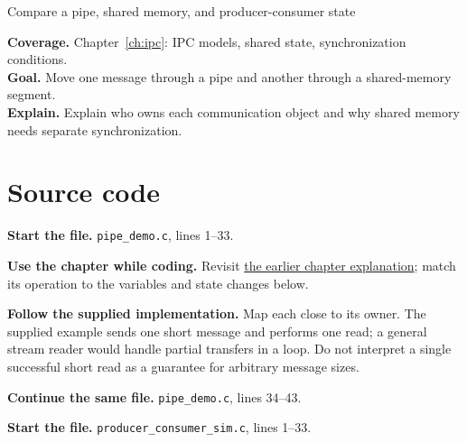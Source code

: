 \begin{labproject}{Compare a pipe, shared memory, and producer-consumer state}

\textbf{Coverage.} Chapter~\ref{ch:ipc}: IPC models, shared state, synchronization conditions.\\
\textbf{Goal.} Move one message through a pipe and another through a shared-memory segment.\\
\textbf{Explain.} Explain who owns each communication object and why shared memory needs separate synchronization.




\section*{Source code}
\noindent\textbf{Start the file.} \texttt{pipe\_demo.c}, lines 1--33.



\textbf{Use the chapter while coding.} Revisit \hyperref[ch:ipc]{the earlier chapter explanation}; match its operation to the variables and state changes below.

\textbf{Follow the supplied implementation.} Map each close to its owner. The supplied example sends one short message and performs one read; a general stream reader would handle partial transfers in a loop. Do not interpret a single successful short read as a guarantee for arbitrary message sizes.




\noindent\textbf{Continue the same file.} \texttt{pipe\_demo.c}, lines 34--43.


\noindent\textbf{Start the file.} \texttt{producer\_consumer\_sim.c}, lines 1--33.



\end{labproject}
